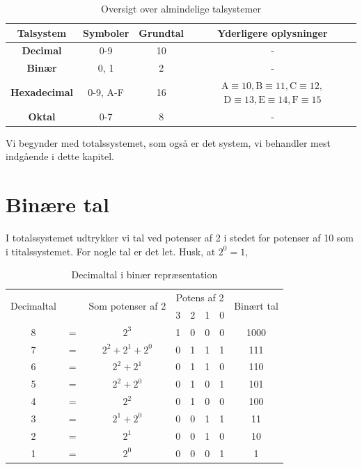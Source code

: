 \begin{table}[ht]
\centering
\renewcommand{\arraystretch}{1.4}
\begin{tabular}{|c|c|c|c|}
\hline
\textbf{Talsystem} & \textbf{Symboler} & \textbf{Grundtal} & \textbf{Yderligere oplysninger} \\ \hline
\textbf{Decimal} & 0-9 & 10 & - \\ \hline
\textbf{Binær} & 0, 1 & 2 & - \\ \hline
\textbf{Hexadecimal} & 0-9, A-F & 16 & $\mathrm{A} \equiv 10, \mathrm{B} \equiv 11, \mathrm{C} \equiv 12,$ $\mathrm{D} \equiv 13, \mathrm{E} \equiv 14, \mathrm{F} \equiv 15$ \\ \hline
\textbf{Oktal} & 0-7 & 8 & - \\ \hline
\end{tabular}
\caption{Oversigt over almindelige talsystemer}
\label{tab:number_systems}
\end{table}

Vi begynder med totalssystemet, som også er det system, vi behandler mest indgående i dette kapitel.

\section{Binære tal}
I totalssystemet udtrykker vi tal ved potenser af 2 i stedet for potenser af 10 som i titalssystemet. For nogle tal er det let. Husk, at $2^0=1$,

\begin{table}[!ht]
\centering
\renewcommand{\arraystretch}{1.4}
\begin{tabular}{|c c c c c c c c|}
\hline 
\multirow{2}{*}{Decimaltal} & & \multirow{2}{*}{Som potenser af 2} & \multicolumn{4}{c}{Potens af 2} & \multirow{2}{*}{Binært tal} \\
& & & 3 & 2 & 1 & 0 & \\ \hline
8 & $=$ & $2^3$ & 1 & 0 & 0 & 0 & 1000 \\
7 & $=$ & $2^2 + 2^1 + 2^0$ & 0 & 1 & 1 & 1 & 111 \\
6 & $=$ & $2^2 + 2^1$ & 0 & 1 & 1 & 0 & 110 \\
5 & $=$ & $2^2 + 2^0$ & 0 & 1 & 0 & 1 & 101 \\
4 & $=$ & $2^2$ & 0 & 1 & 0 & 0 & 100 \\
3 & $=$ & $2^1 + 2^0$ & 0 & 0 & 1 & 1 & 11 \\
2 & $=$ & $2^1$ & 0 & 0 & 1 & 0 & 10 \\
1 & $=$ & $2^0$ & 0 & 0 & 0 & 1 & 1 \\ \hline
\end{tabular}
\caption{Decimaltal i binær repræsentation}
\end{table}

